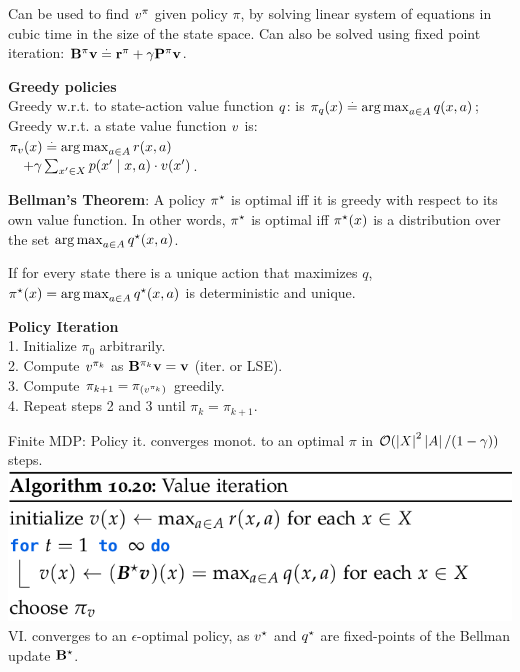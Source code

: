 Can be used to find $\fnv[\pi]$ given policy $\pi$, by solving linear system of equations in cubic time in the size of the state space. Can also be solved using fixed point iteration: $\mathbf{B}^\pi \mathbf{v} \overset{.}{=} \mathbf{r}^\pi + \gamma \mathbf{P}^\pi \mathbf{v}$.
\begin{framed}
    \textbf{Greedy policies} \\
    Greedy w.r.t. to state-action value function $\fnq$: is $\pi_{\fnq}(x) \defeq \argmax_{a \in \sA} \q{x}{a}$;\\
    Greedy w.r.t. a state value function $\fnv$ is: \\
    $\pi_{\fnv}(x) \defeq \argmax_{a \in \sA} r(x, a)$ \\
    $ \quad+ \gamma \sum_{x' \in \sX} p(x' \mid x, a) \cdot \v{x'}$.
    \vspace{2mm}
\end{framed}
\begin{framed}
    \textbf{Bellman's Theorem}: A policy $\pi^\star$ is optimal iff it is greedy with respect to its own value function. In other words, $\pi^\star$ is optimal iff $\pi^\star(x)$ is a distribution over the set $\argmax_{a \in \sA} \q*{x}{a}$.
\end{framed}
If for every state there is a unique action that maximizes $q$, $\pis(x) = \argmax_{a \in \sA} \q*{x}{a}$ is deterministic and unique.
\begin{framed}
    \textbf{Policy Iteration} \\
    1. Initialize $\pi_0$ arbitrarily. \\
    2. Compute $\fnv[\pi_k]$ as $\mathbf{B}^{\pi_k} \mathbf{v} = \mathbf{v}$ (iter. or LSE). \\
    3. Compute $\pi_{k+1} = \pi_{(\fnv[\pi_k])}$ greedily. \\
    4. Repeat steps 2 and 3 until $\pi_k = \pi_{k+1}$.
\end{framed}
Finite MDP: Policy it. converges monot. to an optimal $\pi$ in $\mathcal{O}(\left| X \right|^2 \left| A \right| / (1 - \gamma))$ steps.
\includegraphics[width=0.9\linewidth]{images/Value_Iteration.png}
VI. converges to an $\epsilon$-optimal policy, as $\fnv[\star]$ and $\fnq[\star]$ are fixed-points of the Bellman update $\mathbf{B^\star}$.

